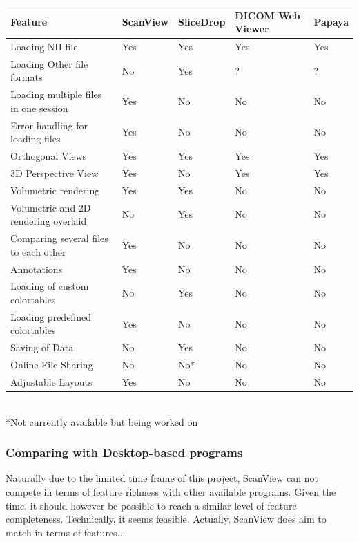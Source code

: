 \documentclass[a4paper,11pt,titlepage]{article}
\begin{document}
\begin{center}

  \begin{tabular}{ | l | l | l | l | l |}
    \hline
    Feature & ScanView & SliceDrop & DICOM Web Viewer & Papaya \\ \hline \hline

Loading NII file & Yes & Yes & Yes & Yes\\ \hline
Loading Other file formats & No & Yes & ? & ?\\ \hline
Loading multiple files in one session & Yes & No & No & No \\ \hline
Error handling for loading files & Yes & No & No & No\\ \hline
Orthogonal Views & Yes & Yes & Yes & Yes\\ \hline
3D Perspective View & Yes & No & Yes & Yes \\ \hline
Volumetric rendering & Yes & Yes & No & No\\ \hline
Volumetric and 2D rendering overlaid & No & Yes & No & No \\ \hline
Comparing several files to each other & Yes & No & No & No\\ \hline
Annotations & Yes & No & No & No\\ \hline
Loading of custom colortables & No & Yes & No & No \\ \hline
Loading predefined colortables & Yes & No & No & No\\ \hline
Saving of Data & No & Yes & No & No\\ \hline
Online File Sharing & No & No* & No & No\\ \hline
Adjustable Layouts & Yes & No & No & No \\ \hline

  \end{tabular}\\



*Not currently available but being worked on


\end{center}



\subsubsection{Comparing with Desktop-based programs}

Naturally due to the limited time frame of this project, ScanView can not compete in terms of feature richness with other available programs. Given the time, it should however be possible to reach a similar level of feature completeness. Technically, it seems feasible. Actually, ScanView does aim to match in terms of features...
\end{document}
